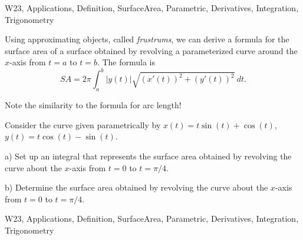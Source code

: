 \begin{tagblock}{W23, Applications, Definition, SurfaceArea, Parametric, Derivatives, Integration, Trigonometry}
\begin{question}
	
Using approximating objects, called \textit{frustrums}, we can derive a formula for the surface area of a surface obtained by revolving a parameterized curve around the $x$-axis from $t=a$ to $t=b$. The formula is
\[
SA=2\pi\int_a^b|y(t)|\sqrt{(x'(t))^2+(y'(t))^2} \ dt.
\]

Note the similarity to the formula for arc length!

\bigskip

Consider the curve given parametrically by $x(t)=t\sin(t)+\cos(t)$, $y(t)=t\cos(t)-\sin(t)$. 

\bigskip

a)  Set up an integral that represents the surface area obtained by revolving the curve about the $x$-axis from $t=0$ to $t=\pi/4$. 

\bigskip

b) Determine the surface area obtained by revolving the curve about the $x$-axis from $t=0$ to $t=\pi/4$. 

    
\begin{tags}
        W23, Applications, Definition, SurfaceArea, Parametric, Derivatives, Integration, Trigonometry
\end{tags}
    
\begin{diary}
\end{diary}
	
\begin{solution}

\end{solution}
	
\end{question}

\end{tagblock}

